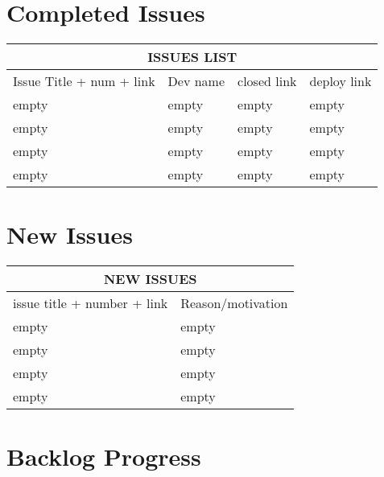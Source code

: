 \documentclass{article}
\begin{document}
\section{Completed Issues}

{
\begin{tabular}{ |p{2cm}|p{2cm}|p{2cm}|p{2cm}|  }
    \hline
    \multicolumn{4}{|c|}{ISSUES LIST}\\
    \hline
        Issue Title + num + link & Dev name & closed link & deploy link\\
    \hline
        empty & empty & empty & empty \\
        empty & empty & empty & empty \\
        empty & empty & empty & empty \\
        empty & empty & empty & empty \\
    \hline
\end{tabular}



\section{New Issues}
{
\begin{tabular}{ |p{4cm}|p{4cm}|  }
    \hline
    \multicolumn{2}{|c|}{NEW ISSUES}\\
    \hline
        issue title + number + link & Reason/motivation\\ 
    \hline
        empty & empty \\
        empty & empty \\
        empty & empty \\
        empty & empty \\
    \hline
\end{tabular}



\section{Backlog Progress}

}}
\end{document}
